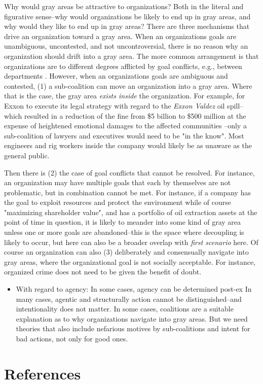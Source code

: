 \documentclass{article}
\begin{document}
	Why would gray areas be attractive to organizations? Both in the literal and figurative sense--why would organizations be likely to end up in gray areas, and why would they like to end up in gray areas? There are three mechanisms that drive an organization toward a gray area. When an organizations goals are unambiguous, uncontested, and not uncontroversial, there is no reason why an organization should drift into a gray area. The more common arrangement is that organizations are to different degrees afflicted by goal conflicts, e.g., between departments \citep{Cyert1963}. However, when an organizations goals are ambiguous and contested, (1) a sub-coalition can move an organization into a gray area. Where that is the case, the gray area \textit{exists inside} the organization. For example, for Exxon to execute its legal strategy with regard to the \textit{Exxon Valdez} oil spill--which resulted in a reduction of the fine from \$5 billion to \$500 million at the expense of heightened emotional damages to the affected communities \citep{Kirsch2020}--only a sub-coalition of lawyers and executives would need to be "in the know". Most engineers and rig workers inside the company would likely be as unaware as the general public.

	Then there is (2) the case of goal conflicts that cannot be resolved. For instance, an organization may have multiple goals that each by themselves are not problematic, but in combination cannot be met. For instance, if a company has the goal to exploit resources and protect the environment while of course "maximizing shareholder value", and has a portfolio of oil extraction assets at the point of time in question, it is likely to meander into some kind of gray area unless one or more goals are abandoned--this is the space where decoupling is likely to occur, but here can also be a broader overlap with \textit{first scenario} here. Of course an organization can also (3) deliberately and consensually navigate into gray areas, where the organizational goal is not socially acceptable. For instance, organized crime does not need to be given the benefit of doubt.

	\begin{itemize}
		\item With regard to agency:
			\subitem In some cases, agency can be determined post-ex
			\subitem In many cases, agentic and structurally  action cannot be distinguished--and intentionality does not matter.
			\subitem In some cases, coalitions are a suitable explanation as to why organizations navigate into gray areas.
			\subitem But we need theories that also include nefarious motives by sub-coalitions and intent for bad actions, not only for good ones. 
	\end{itemize}

	\clearpage
	\section*{References}
	\printbibliography[heading=none]
\end{document}
